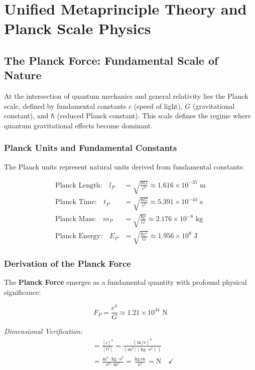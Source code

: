 \chapter{Unified Metaprinciple Theory and Planck Scale Physics}

\section{The Planck Force: Fundamental Scale of Nature}

At the intersection of quantum mechanics and general relativity lies the Planck scale, defined by fundamental constants $c$ (speed of light), $G$ (gravitational constant), and $\hbar$ (reduced Planck constant). This scale defines the regime where quantum gravitational effects become dominant.

\subsection{Planck Units and Fundamental Constants}

The Planck units represent natural units derived from fundamental constants:

\begin{align}
\text{Planck Length:} \quad l_P &= \sqrt{\frac{\hbar G}{c^3}} \approx 1.616 \times 10^{-35} \text{ m} \\
\text{Planck Time:} \quad t_P &= \sqrt{\frac{\hbar G}{c^5}} \approx 5.391 \times 10^{-44} \text{ s} \\
\text{Planck Mass:} \quad m_P &= \sqrt{\frac{\hbar c}{G}} \approx 2.176 \times 10^{-8} \text{ kg} \\
\text{Planck Energy:} \quad E_P &= \sqrt{\frac{\hbar c^5}{G}} \approx 1.956 \times 10^9 \text{ J}
\end{align}

\subsection{Derivation of the Planck Force}

The \textbf{Planck Force} emerges as a fundamental quantity with profound physical significance:

\begin{equation}
F_P = \frac{c^4}{G} \approx 1.21 \times 10^{44} \text{ N}
\end{equation}

\textit{Dimensional Verification:}
\begin{align}
[F_P] &= \frac{[c]^4}{[G]} = \frac{(\text{m}/\text{s})^4}{(\text{m}^3/(\text{kg} \cdot \text{s}^2))} \\
&= \frac{\text{m}^4 \cdot \text{kg} \cdot \text{s}^2}{\text{s}^4 \cdot \text{m}^3} = \frac{\text{kg} \cdot \text{m}}{\text{s}^2} = \text{N} \quad \checkmark
\end{align}

